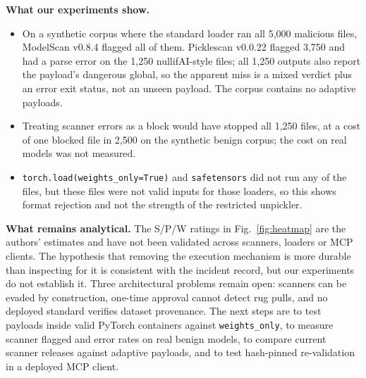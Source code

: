 \documentclass[conference]{IEEEtran}
\begin{document}
\textbf{What our experiments show.}
\begin{itemize}
\item On a synthetic corpus where the standard loader ran all 5,000 malicious files, ModelScan v0.8.4 flagged all of them. Picklescan v0.0.22 flagged 3,750 and had a parse error on the 1,250 nullifAI-style files; all 1,250 outputs also report the payload's dangerous global, so the apparent miss is a mixed verdict plus an error exit status, not an unseen payload. The corpus contains no adaptive payloads.
\item Treating scanner errors as a block would have stopped all 1,250 files, at a cost of one blocked file in 2,500 on the synthetic benign corpus; the cost on real models was not measured.
\item \texttt{torch.load(weights\_only=True)} and \texttt{safetensors} did not run any of the files, but these files were not valid inputs for those loaders, so this shows format rejection and not the strength of the restricted unpickler.
\end{itemize}

\textbf{What remains analytical.} The S/P/W ratings in Fig.~\ref{fig:heatmap} are the authors' estimates and have not been validated across scanners, loaders or MCP clients. The hypothesis that removing the execution mechanism is more durable than inspecting for it is consistent with the incident record, but our experiments do not establish it. Three architectural problems remain open: scanners can be evaded by construction, one-time approval cannot detect rug pulls, and no deployed standard verifies dataset provenance. The next steps are to test payloads inside valid PyTorch containers against \texttt{weights\_only}, to measure scanner flagged and error rates on real benign models, to compare current scanner releases against adaptive payloads, and to test hash-pinned re-validation in a deployed MCP client.
\end{document}
